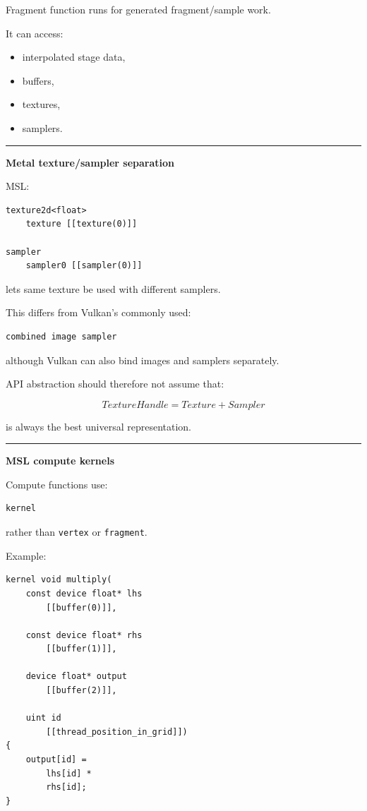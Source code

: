 Fragment function runs for generated fragment/sample work.

It can access:

\begin{itemize}
\tightlist
\item
  interpolated stage data,
\item
  buffers,
\item
  textures,
\item
  samplers.
\end{itemize}

\begin{center}\rule{0.5\linewidth}{0.5pt}\end{center}

\textbf{Metal texture/sampler separation}

MSL:

\begin{verbatim}
texture2d<float>
    texture [[texture(0)]]

sampler
    sampler0 [[sampler(0)]]
\end{verbatim}

lets same texture be used with different samplers.

This differs from Vulkan's commonly used:

\begin{verbatim}
combined image sampler
\end{verbatim}

although Vulkan can also bind images and samplers separately.

API abstraction should therefore not assume that:

\[
TextureHandle
=
Texture+Sampler
\]

is always the best universal representation.

\begin{center}\rule{0.5\linewidth}{0.5pt}\end{center}

\textbf{MSL compute kernels}

Compute functions use:

\begin{verbatim}
kernel
\end{verbatim}

rather than \texttt{vertex} or \texttt{fragment}.

Example:

\begin{verbatim}
kernel void multiply(
    const device float* lhs
        [[buffer(0)]],

    const device float* rhs
        [[buffer(1)]],

    device float* output
        [[buffer(2)]],

    uint id
        [[thread_position_in_grid]])
{
    output[id] =
        lhs[id] *
        rhs[id];
}
\end{verbatim}

